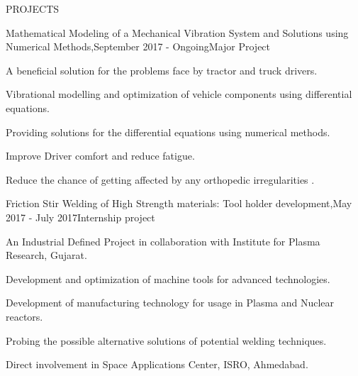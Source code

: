 \documentclass{resume} %
\begin{document}

\begin{rSection}{PROJECTS}

\begin{rSubsection}{Mathematical Modeling of a Mechanical Vibration System and Solutions using Numerical Methods,}{September 2017 - Ongoing}{Major Project}{} 
\item A beneficial solution for the problems face by tractor and truck drivers.
\item Vibrational modelling and optimization of vehicle components using differential equations.
\item Providing solutions for the differential equations using numerical methods.
\item Improve Driver comfort and reduce fatigue.
\item Reduce the chance of getting affected by any orthopedic irregularities .

\end{rSubsection} 



\begin{rSubsection}{Friction Stir Welding of High Strength materials: Tool holder development,}{May 2017 - July 2017}{Internship project}{}
\item An Industrial Defined Project in collaboration with Institute for Plasma Research, Gujarat.
\item Development and optimization of machine tools for advanced technologies.
\item Development of manufacturing technology for usage in Plasma and Nuclear reactors.
\item Probing the possible alternative solutions of potential welding techniques.
\item Direct involvement in Space Applications Center, ISRO, Ahmedabad.

\end{rSubsection}


\end{rSection} 

\end{document}
